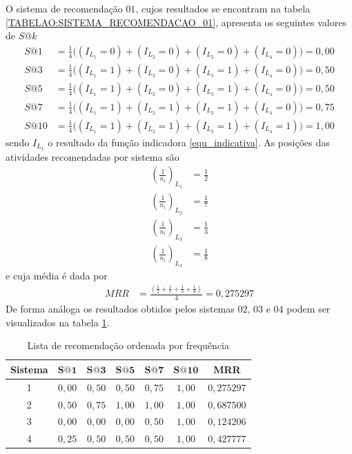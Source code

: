 O sistema de recomendação \(01\), cujos resultados se encontram na tabela \ref{TABELAO:SISTEMA_RECOMENDACAO_01}, apresenta os seguintes valores de \(S@k\)
\begin{align}
S@1 &= \frac{1}{4}  \Big( (I_{L_{1}} = 0) + (I_{L_{2}} = 0) + (I_{L_{3}} = 0) + (I_{L_{4}} = 0) \Big)	=	0,00	\\
S@3 &= \frac{1}{4}  \Big( (I_{L_{1}} = 1) + (I_{L_{2}} = 0) + (I_{L_{3}} = 1) + (I_{L_{4}} = 0) \Big)	=	0,50	\\
S@5 &= \frac{1}{4}  \Big( (I_{L_{1}} = 1) + (I_{L_{2}} = 0) + (I_{L_{3}} = 1) + (I_{L_{4}} = 0) \Big)	=	0,50	\\
S@7 &= \frac{1}{4}  \Big( (I_{L_{1}} = 1) + (I_{L_{2}} = 1) + (I_{L_{3}} = 1) + (I_{L_{4}} = 0) \Big)	=	0,75	\\
S@10 &= \frac{1}{4} \Big( (I_{L_{1}} = 1) + (I_{L_{2}} = 1) + (I_{L_{3}} = 1) + (I_{L_{4}} = 1) \Big) 	=	1,00		
\end{align}
sendo \(I_{L_{1}}\) o resultado da função indicadora \eqref{equ_indicativa}. As posições das atividades recomendadas por sistema são
\begin{align}
\left( \frac{1}{n_{i}} \right)_{L_{1}}  &= \frac{1}{2} 	\\
\left( \frac{1}{n_{i}} \right)_{L_{2}} &= \frac{1}{7} 	\\
\left( \frac{1}{n_{i}} \right)_{L_{3}} &= \frac{1}{3} 	\\
\left( \frac{1}{n_{i}} \right)_{L_{4}} &= \frac{1}{8} 	
\end{align}
e cuja média é dada por
\begin{align}
MRR &= \frac{\left( \frac{1}{2} + \frac{1}{7} + \frac{1}{3} + \frac{1}{8} \right)}{4} = 0,275297
\end{align}
De forma análoga os resultados obtidos pelos sistemas \(02\), \(03\) e \(04\) podem ser visualizados na tabela \ref{tabela_resultados_mrr_Sak}.
\begin{table}[!htb]
	\centering
	\caption{Lista de recomendação ordenada por frequência}
	\begin{tabular}{ccccccc} \hline
		\textbf{Sistema} & \(\mathbf{S@1}\) & \(\mathbf{S@3}\) & \(\mathbf{S@5}\) & \(\mathbf{S@7}\) & \(\mathbf{S@10}\) & \textbf{MRR}	\\ \hline
		1 & \(0,00\) 	& \(0,50\)	& \(0,50\)	& \(0,75\)	& \(1,00\) & \(0,275297\) \\ 
		2 & \(0,50\)	& \(0,75\)	& \(1,00\)	& \(1,00\)	& \(1,00\) & \(0,687500\) \\ 
		3 & \(0,00\)	& \(0,00\)	& \(0,00\)	& \(0,50\)	& \(1,00\) & \(0,124206\) \\ 
		4 & \(0,25\)	& \(0,50\)	& \(0,50\) 	& \(0,50\)	& \(1,00\) & \(0,427777\) \\ \hline
	\end{tabular}
	\label{tabela_resultados_mrr_Sak}
	\vspace{0.1cm}
	\source{\varAutorData}
\end{table}

